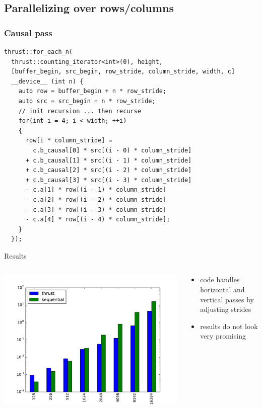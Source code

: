 \documentclass{beamer}
\begin{document}
\subsection{Parallelizing over rows/columns}
\begin{frame}[fragile]
\frametitle{Causal pass}
  \begin{lstlisting}[basicstyle=\tiny]
thrust::for_each_n(
  thrust::counting_iterator<int>(0), height,
  [buffer_begin, src_begin, row_stride, column_stride, width, c]
  __device__ (int n) {
    auto row = buffer_begin + n * row_stride;
    auto src = src_begin + n * row_stride;
    // init recursion ... then recurse
    for(int i = 4; i < width; ++i)
    {
      row[i * column_stride] =
        c.b_causal[0] * src[(i - 0) * column_stride]
      + c.b_causal[1] * src[(i - 1) * column_stride]
      + c.b_causal[2] * src[(i - 2) * column_stride]
      + c.b_causal[3] * src[(i - 3) * column_stride]
      - c.a[1] * row[(i - 1) * column_stride]
      - c.a[2] * row[(i - 2) * column_stride]
      - c.a[3] * row[(i - 3) * column_stride]
      - c.a[4] * row[(i - 4) * column_stride];
    }
  });
  \end{lstlisting}
\end{frame}

\begin{frame}{Results}
  \begin{columns}
    \begin{column}{7cm}
      \includegraphics[scale=0.4]{imgs/thrust_vs_sequential_total.pdf} 
    \end{column}
    \begin{column}{3cm}
      \begin{itemize}
        \item code handles horizontal and vertical passes by adjusting
          strides
        \item results do not look very promising
      \end{itemize}
    \end{column}
  \end{columns}
\end{frame} 
\end{document}
